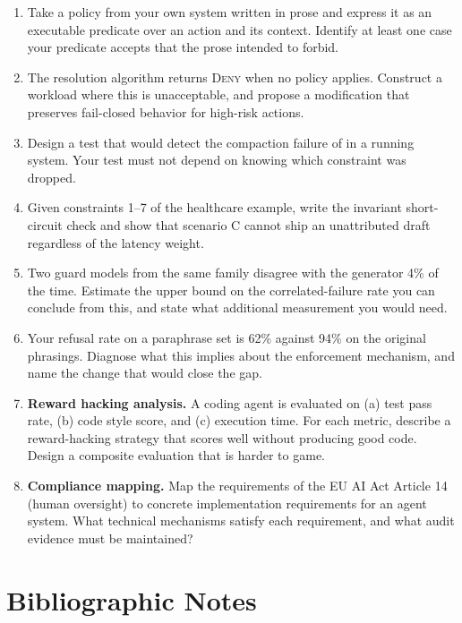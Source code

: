 \documentclass[11pt]{book}
\begin{document}
\begin{enumerate}
\item Take a policy from your own system written in prose and express it as an executable predicate over an action and its context. Identify at least one case your predicate accepts that the prose intended to forbid.

\item The resolution algorithm returns \textsc{Deny} when no policy applies. Construct a workload where this is unacceptable, and propose a modification that preserves fail-closed behavior for high-risk actions.

\item Design a test that would detect the compaction failure of \cite{govdecay2026} in a running system. Your test must not depend on knowing which constraint was dropped.

\item Given constraints 1--7 of the healthcare example, write the invariant short-circuit check and show that scenario C cannot ship an unattributed draft regardless of the latency weight.

\item Two guard models from the same family disagree with the generator 4\% of the time. Estimate the upper bound on the correlated-failure rate you can conclude from this, and state what additional measurement you would need.

\item Your refusal rate on a paraphrase set is 62\% against 94\% on the original phrasings. Diagnose what this implies about the enforcement mechanism, and name the change that would close the gap.

\item \textbf{Reward hacking analysis.} A coding agent is evaluated on (a) test pass rate, (b) code style score, and (c) execution time. For each metric, describe a reward-hacking strategy that scores well without producing good code. Design a composite evaluation that is harder to game.

\item \textbf{Compliance mapping.} Map the requirements of the EU AI Act Article 14 (human oversight) to concrete implementation requirements for an agent system. What technical mechanisms satisfy each requirement, and what audit evidence must be maintained?
\end{enumerate}

\section*{Bibliographic Notes}
\end{document}
